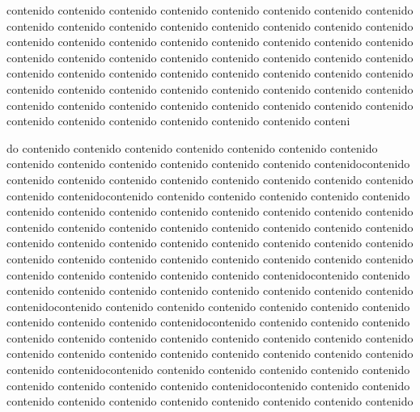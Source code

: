 \documentclass{report}
\theoremstyle{remark}%
\begin{document}
\begin{multicols}{3}%
contenido contenido contenido contenido contenido contenido contenido contenido contenido contenido contenido contenido contenido contenido contenido contenido contenido contenido contenido contenido contenido contenido contenido contenido contenido contenido contenido contenido contenido contenido contenido contenido contenido contenido contenido contenido contenido contenido contenido contenido contenido contenido contenido contenido contenido contenido contenido contenido contenido contenido contenido contenido contenido contenido contenido contenido contenido contenido contenido contenido contenido contenido conteni

\columnbreak%

do contenido contenido contenido contenido contenido contenido contenido contenido contenido contenido contenido contenido contenido contenidocontenido contenido contenido contenido contenido contenido contenido contenido contenido contenido contenidocontenido contenido contenido contenido contenido contenido contenido contenido contenido contenido contenido contenido contenido contenido contenido contenido contenido contenido contenido contenido contenido contenido contenido contenido contenido contenido contenido contenido contenido contenido contenido contenido contenido contenido contenido contenido contenido contenido contenido contenido contenido contenido contenido contenidocontenido contenido contenido contenido contenido contenido contenido contenido contenido contenido contenidocontenido contenido contenido contenido contenido contenido contenido contenido contenido contenido contenidocontenido contenido contenido contenido contenido contenido contenido contenido contenido contenido contenido contenido contenido contenido contenido contenido contenido contenido contenido contenido contenido contenidocontenido contenido contenido contenido contenido contenido contenido contenido contenido contenido contenidocontenido contenido contenido contenido contenido contenido contenido contenido contenido contenido contenido
\end{multicols}


\end{document}
